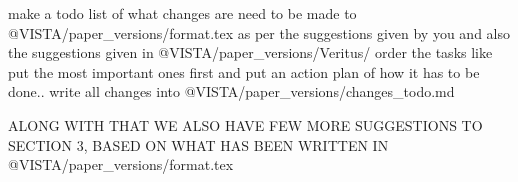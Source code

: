 make a todo list of what changes are need to be made to @VISTA/paper_versions/format.tex  as per the suggestions given by you and also the suggestions given in @VISTA/paper_versions/Veritus/  order the tasks like put the most important ones first and put an action plan of how it has to be done.. write all changes into @VISTA/paper_versions/changes_todo.md  


ALONG WITH THAT WE ALSO HAVE FEW MORE SUGGESTIONS TO SECTION 3, BASED ON WHAT HAS BEEN WRITTEN IN @VISTA/paper_versions/format.tex 